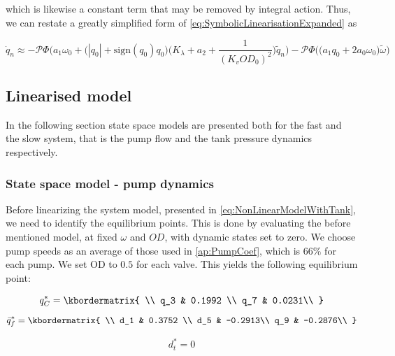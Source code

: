 which is likewise a constant term that may be removed by integral action. Thus, we can restate a greatly simplified form of \cref{eq:SymbolicLinearisationExpanded} as

\begin{equation}\label{eq:SymbolicLinearisationSimplified}
	\dot{q}_n \approx -\mathcal{P}\Phi\Bigg(a_1\omega_0 + \Big(|q_0|+\text{sign}(q_0)q_0\Big)\Bigg(K_\lambda + a_2 + \frac{1}{(K_v OD_0)^2}\Bigg) \tilde{q}_n \Bigg) -  \mathcal{P}\Phi\Bigg(\Big(a_1 q_0 + 2a_0\omega_0\Big) \tilde{\omega}\Bigg)
\end{equation}

\clearpage

\subsection{Linearised model} \label{sec:LinearisedModel}
In the following section state space models are presented both for the fast and the slow system, that is the pump flow and the tank pressure dynamics respectively. 

\subsubsection{State space model - pump dynamics}
Before linearizing the system model, presented in \cref{eq:NonLinearModelWithTank}, we need to identify the equilibrium points. This is done by evaluating the before mentioned model, at fixed $ \omega $ and $ OD $, with dynamic states set to zero. We choose pump speeds as an average of those used in \cref{ap:PumpCoef}, which is $ 66\% $ for each pump. We set OD to $ 0.5 $ for each valve. This yields the following equilibrium point:

	\begin{equation}
	q_C^* = \kbordermatrix{
		\\
		q_3 & 0.1992 \\ 
		q_7 & 0.0231\\
	}
\end{equation}
	\begin{equation}
	\bar{q}_f^* = \kbordermatrix{
		\\
		d_1 & 0.3752 \\ 
		d_5 & -0.2913\\
		q_9 & -0.2876\\
	}
	\end{equation}

\begin{equation}
	d_t^* = 0
\end{equation}


